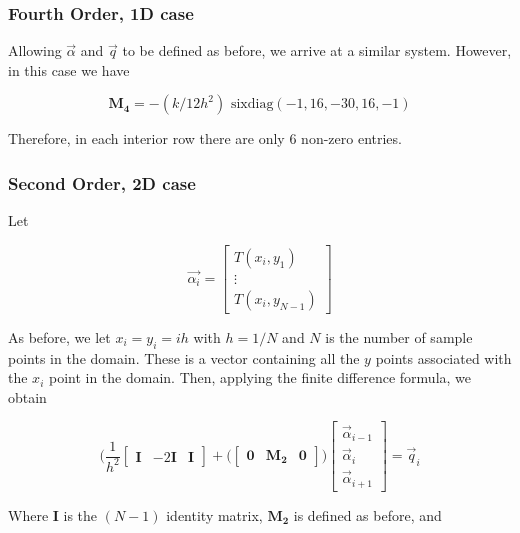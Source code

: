 \subsubsection{Fourth Order, 1D case}

Allowing $\Vec{\alpha}$ and $\Vec{q}$ to be defined as before, we arrive at a similar system. However, in this case we have 

\begin{equation*}
    \mathbf{M_4} = -(k/12 h^2)\text{ sixdiag}(-1, 16, -30, 16, -1)
\end{equation*}

Therefore, in each interior row there are only $6$ non-zero entries.

\subsubsection{Second Order, 2D case}

Let 

\begin{equation*}
\Vec{\alpha_i} = 
     \begin{bmatrix}
        T(x_i,y_1) \\
        \vdots \\
        T(x_i, y_{N-1}) 
    \end{bmatrix}  
\end{equation*}

As before, we let $x_i = y_i = ih$ with $h = 1/N$ and $N$ is the number of sample points in the domain. These is a vector containing all the $y$ points associated with the $x_i$ point in the domain. Then, applying the finite difference formula, we obtain

\begin{equation*}
\big( \frac{1}{h^2} \begin{bmatrix}
\mathbf{I} & -2\mathbf{I} & \mathbf{I}
\end{bmatrix} + \big(\begin{bmatrix}
\mathbf{0} & \mathbf{M_2} & \mathbf{0} 
\end{bmatrix} \big) \begin{bmatrix}
\Vec{\alpha}_{i-1} \\
\Vec{\alpha}_i \\
\Vec{\alpha}_{i+1}
\end{bmatrix}  = \Vec{q}_i
\end{equation*}

Where $\mathbf{I}$ is the $(N-1)$ identity matrix, $\mathbf{M_2}$ is defined as before, and 

